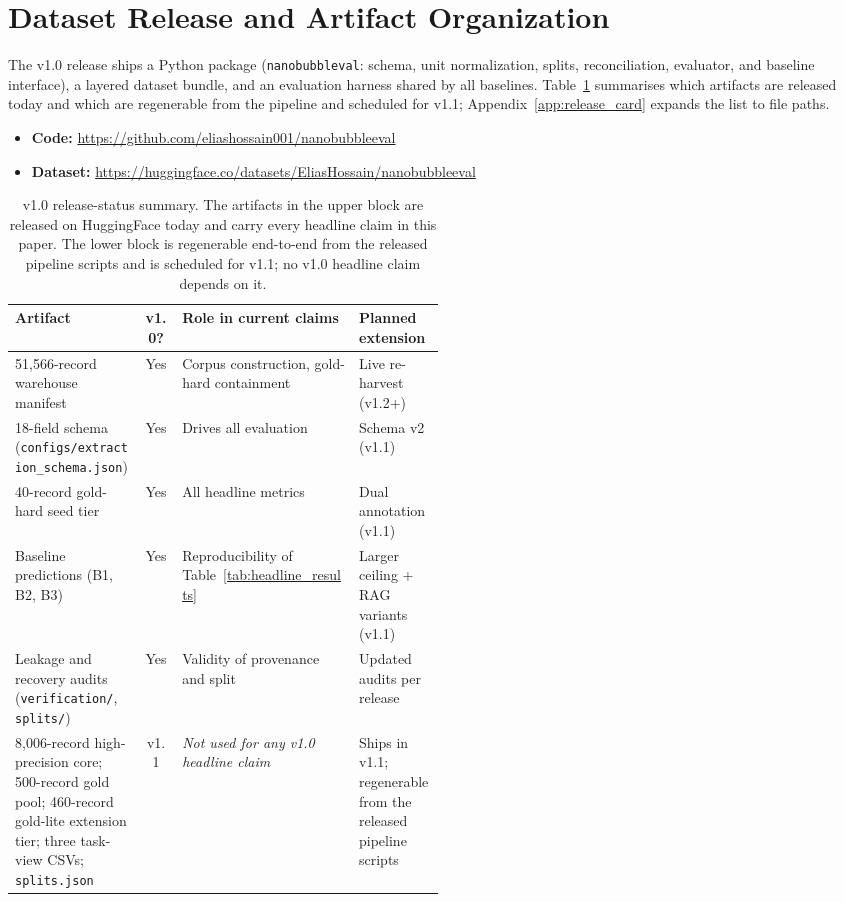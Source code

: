 \documentclass{article}
\begin{document}
\section{Dataset Release and Artifact Organization}
\label{sec:release}

The v1.0 release ships a Python package (\texttt{nanobubbleval}: schema, unit normalization, splits, reconciliation, evaluator, and baseline interface), a layered dataset bundle, and an evaluation harness shared by all baselines. Table~\ref{tab:release_status} summarises which artifacts are released today and which are regenerable from the pipeline and scheduled for v1.1; Appendix~\ref{app:release_card} expands the list to file paths.

\begin{itemize}\itemsep0pt
\item \textbf{Code:} \url{https://github.com/eliashossain001/nanobubbleeval}
\item \textbf{Dataset:} \url{https://huggingface.co/datasets/EliasHossain/nanobubbleeval}
\end{itemize}

\begin{table}[h]
\centering
\caption{v1.0 release-status summary. The artifacts in the upper block are
released on HuggingFace today and carry every headline claim in this paper.
The lower block is regenerable end-to-end from the released pipeline scripts
and is scheduled for v1.1; no v1.0 headline claim depends on it.}
\label{tab:release_status}
\small
\setlength{\tabcolsep}{4pt}
\renewcommand{\arraystretch}{1.15}
\begin{tabularx}{\linewidth}{@{}p{0.30\linewidth} c X p{0.20\linewidth}@{}}
\toprule
\textbf{Artifact} & \textbf{v1.0?} & \textbf{Role in current claims} & \textbf{Planned extension} \\
\midrule
51{,}566-record warehouse manifest    & Yes & Corpus construction, gold-hard containment & Live re-harvest (v1.2+) \\
18-field schema (\texttt{configs/extraction\_schema.json}) & Yes & Drives all evaluation                       & Schema v2 (v1.1) \\
40-record gold-hard seed tier         & Yes & All headline metrics                        & Dual annotation (v1.1) \\
Baseline predictions (B1, B2, B3)     & Yes & Reproducibility of Table~\ref{tab:headline_results} & Larger ceiling + RAG variants (v1.1) \\
Leakage and recovery audits (\texttt{verification/}, \texttt{splits/}) & Yes & Validity of provenance and split & Updated audits per release \\
\midrule
8{,}006-record high-precision core; 500-record gold pool; 460-record gold-lite extension tier; three task-view CSVs; \texttt{splits.json} & v1.1 & \emph{Not used for any v1.0 headline claim} & Ships in v1.1; regenerable from the released pipeline scripts \\
\bottomrule
\end{tabularx}
\end{table}
\end{document}
